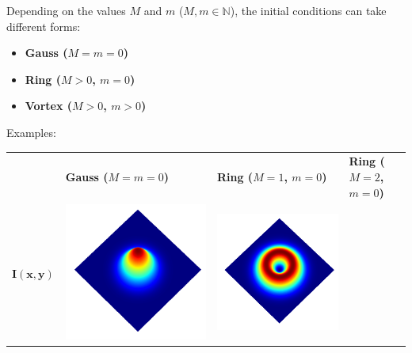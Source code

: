 \documentclass[a4paper, 12pt]{article}
\begin{document}
Depending on the values $M$ and $m$ ($M, m \in \mathbb{N}$), the initial conditions can take different forms:
\begin{itemize}
\item \textbf{Gauss ($M=m=0$)} 
\item \textbf{Ring ($M>0$, $m=0$)} 
\item \textbf{Vortex ($M>0$, $m>0$)}
\end{itemize}
Examples:
\begin{center}
\begin{tabular}{M{1.5cm}M{5cm}M{5cm}M{5cm}}
\ & \textbf{Gauss ($M=m=0$)} & \textbf{Ring ($M=1$, $m=0$)} & \textbf{Ring ($M=2$, $m=0$)} \\
 $\mathbf{I(x,y)}$ &
\includegraphics[width=\linewidth]{../resources/intensity_M=0.png} & 
\includegraphics[width=\linewidth]{../resources/intensity_M=1.png} & 

\end{tabular}
\end{center}
\end{document}
